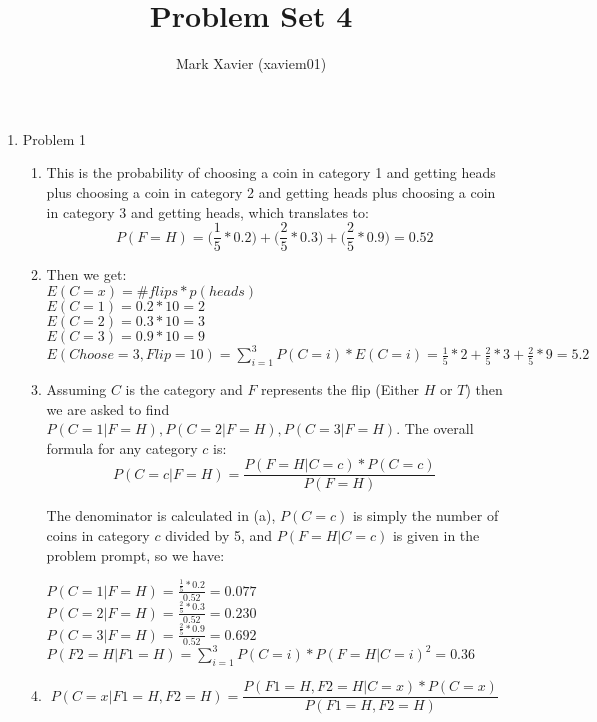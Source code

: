 \documentclass{article}
\title{Problem Set 4}
\author{Mark Xavier (xaviem01)}
\begin{document}
	\maketitle
	
	\begin{enumerate}
		\item Problem 1
			\begin{enumerate}
				\item This is the probability of choosing a coin in category 1 and getting heads plus choosing a coin in category 2 and getting heads plus choosing a coin in category 3 and getting heads, which translates to:
				$$P(F=H) = \bigg(\frac{1}{5} * 0.2\bigg) + \bigg(\frac{2}{5} * 0.3\bigg) + \bigg(\frac{2}{5} * 0.9\bigg) = 0.52$$
				
				\item Then we get:\\
				$E(C=x) = \#flips * p(heads)$\\
				$E(C=1) = 0.2 * 10 = 2$\\
				$E(C=2) = 0.3 * 10 = 3$\\
				$E(C=3) = 0.9 * 10 = 9$\\
				$E(Choose=3, Flip=10) = \sum_{i=1}^{3}P(C=i)*E(C=i) = \frac{1}{5} * 2 + \frac{2}{5} * 3 + \frac{2}{5} * 9 = 5.2$\\
				
				\item Assuming $C$ is the category and $F$ represents the flip (Either $H$ or $T$) then we are asked to find $P(C=1 | F=H), P(C=2 | F=H), P(C=3 | F=H)$.  The overall formula for any category $c$ is:
				$$P(C=c | F=H) = \frac{P(F=H | C=c) * P(C=c)}{P(F=H)}$$
				
				The denominator is calculated in (a), $P(C=c)$ is simply the number of coins in category $c$ divided by 5, and $P(F=H | C=c)$ is given in the problem prompt, so we have:
				
				$P(C=1 | F=H) = \frac{\frac{1}{5} * 0.2}{0.52} = 0.077$\\
				$P(C=2 | F=H) = \frac{\frac{2}{5} * 0.3}{0.52} = 0.230$\\
				$P(C=3 | F=H) = \frac{\frac{2}{5} * 0.9}{0.52} = 0.692$\\
				$P(F2=H | F1=H) = \sum_{i=1}^{3} P(C=i)*P(F=H | C=i)^2 = 0.36$\\
				
				\item $$P(C=x | F1 = H, F2=H) = \frac{P(F1=H, F2=H | C=x) * P(C=x)}{P(F1=H, F2=H)}$$
				

\end{enumerate}
\end{enumerate}
\end{document}
